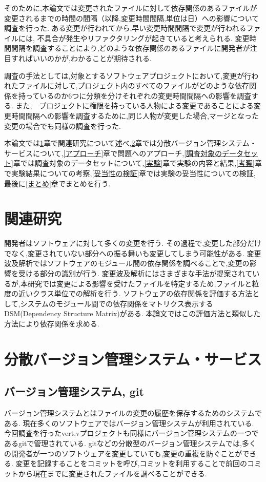 \documentclass{fose2016}           %
\begin{document}
そのために,本論文では変更されたファイルに対して依存関係のあるファイルが変更されるまでの時間の間隔（以降,変更時間間隔,単位は日）への影響について調査を行った.
ある変更が行われてから,早い変更時間間隔で変更が行われるファイルには, 不具合が発生やリファクタリングが起きていると考えられる.
変更時間間隔を調査することにより,どのような依存関係のあるファイルに開発者が注目すればいいのかが,わかることが期待される.

調査の手法としては,対象とするソフトウェアプロジェクトにおいて,変更が行われたファイルに対して,プロジェクト内のすべてのファイルがどのような依存関係を持っているのか6つに分類を分けそれぞれの変更時間間隔への影響を調査する.
また,　プロジェクトに権限を持っている人物による変更であることによる変更時間間隔への影響を調査するために,同じ人物が変更した場合,マージとなった変更の場合でも同様の調査を行った.

本論文では\ref{関連研究}章で関連研究について述べ,\ref{ツール・サービス}章では分散バージョン管理システム・サービスについて,\ref{アプローチ}章で問題へのアプローチ,\ref{調査対象のデータセット}章では調査対象のデータセットについて,\ref{実験}章で実験の内容と結果,\ref{考察}章で実験結果についての考察,\ref{妥当性の検証}章では実験の妥当性についての検証,最後に\ref{まとめ}章でまとめを行う.


\section{関連研究}\label{関連研究}
開発者はソフトウェアに対して多くの変更を行う.
その過程で,変更した部分だけでなく,変更されていない部分への振る舞いも変更してしまう可能性がある.
変更波及解析ではソフトウェアのモジュール間の依存関係を調べることで,変更の影響を受ける部分の識別が行う.
変更波及解析にはさまざまな手法が提案されているが\cite{Ryder,Kondo},本研究では変更による影響を受けたファイルを特定するため,ファイルと粒度の近いクラス単位での解析\cite{Ryder}を行う.
ソフトウェアの依存関係を評価する方法として,システムのモジュール間での依存関係をマトリクス表示するDSM(Dependency Structure Matrix)がある\cite{Nord}.
本論文ではこの評価方法と類似した方法により依存関係を求める.

\section{分散バージョン管理システム・サービス}\label{ツール・サービス}
\subsection{バージョン管理システム, git}
バージョン管理システムとはファイルの変更の履歴を保存するためのシステムである.
現在多くのソフトウェアではバージョン管理システムが利用されている.
今回調査を行ったvert.vプロジェクトも同様にバージョン管理システムの一つであるgitで管理されている.
gitなどの分散型のバージョン管理システムでは,多くの開発者が一つのソフトウェアを変更していても,変更の重複を防ぐことができる.
変更を記録することをコミットを呼び,コミットを利用することで前回のコミットから現在までに変更されたファイルを調べることができる.
\end{document}

